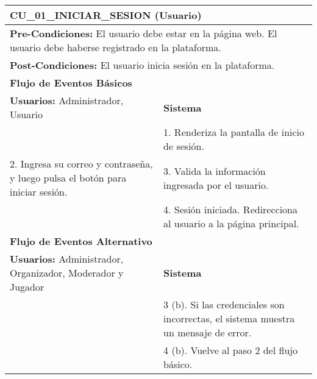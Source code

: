 \begin{center}
  \begin{tabular}{| p{7.5cm} | p{7.5cm} |}
    \hline
    \multicolumn{2}{|p{15cm}|}{\textbf{CU\_01\_INICIAR\_SESION} (Usuario)} \\ \hline
    \multicolumn{2}{|p{15cm}|}{\textbf{Pre-Condiciones:} El usuario debe estar en la página web. El usuario debe haberse registrado en la plataforma.} \\ \hline
    \multicolumn{2}{|p{15cm}|}{\textbf{Post-Condiciones:} El usuario inicia sesión en la plataforma.} \\ \hline
    \multicolumn{2}{|p{7.5cm}|}{\textbf{Flujo de Eventos Básicos}} \\ \hline
    \multicolumn{1}{|p{7.5cm}|}{\textbf{Usuarios:} Administrador, Usuario} & \multicolumn{1}{|p{7.5cm}|}{\textbf{Sistema}} \\ \hline
    
    \multicolumn{1}{|p{7.5cm}|}{} & 
    \multicolumn{1}{|p{7.5cm}|}{1. Renderiza la pantalla de inicio de sesión.}\\ \hline
    
    \multicolumn{1}{|p{7.5cm}|}{2. Ingresa su correo y contraseña, y luego pulsa el botón para iniciar sesión.}& 
    \multicolumn{1}{|p{7.5cm}|}{3. Valida la información ingresada por el usuario.}\\ \hline
    
    \multicolumn{1}{|p{7.5cm}|}{} & 
    \multicolumn{1}{|p{7.5cm}|}{4. Sesión iniciada. Redirecciona al usuario a la página principal.}\\ \hline
    
    \multicolumn{2}{|p{7.5cm}|}{\textbf{Flujo de Eventos Alternativo}} \\ \hline
    
    \multicolumn{1}{|p{7.5cm}|}{\textbf{Usuarios:} Administrador, Organizador, Moderador y Jugador} & \multicolumn{1}{|p{7.5cm}|}{\textbf{Sistema}} \\ \hline
    
    \multicolumn{1}{|p{7.5cm}|}{} & 
    \multicolumn{1}{|p{7.5cm}|}{3 (b). Si las credenciales son incorrectas, el sistema muestra un mensaje de error.}\\ \hline
    
    \multicolumn{1}{|p{7.5cm}|}{} & 
    \multicolumn{1}{|p{7.5cm}|}{4 (b). Vuelve al paso 2 del flujo básico.}\\ \hline
  \end{tabular}
  
  \label{table:usecase:1}
\end{center}

